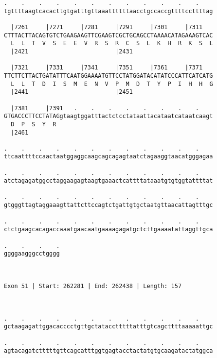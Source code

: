 \documentclass{article}
\begin{document}
\begin{Verbatim}
.    .    .    .    .    .    .    .    .    .    .    .    
tgttttaagtcacacttgtgatttgttaaattttttaacctgccaccgttttccttttag
                                                            
  |7261     |7271     |7281     |7291     |7301     |7311   
CTTTACTTACAGTGTCTGAAGAAGTTCGAAGTCGCTGCAGCCTAAAACATAGAAAGTCAC
  L  L  T  V  S  E  E  V  R  S  R  C  S  L  K  H  R  K  S  L
  |2421                         |2431                       
  
  |7321     |7331     |7341     |7351     |7361     |7371   
TTCTTCTTACTGATATTTCAATGGAAAATGTTCCTATGGATACATATCCCATTCATCATG
  L  L  T  D  I  S  M  E  N  V  P  M  D  T  Y  P  I  H  H  G
  |2441                         |2451                       
  
  |7381     |7391   .    .    .    .    .    .    .    .    
GTGACCCTTCCTATAGgtaagtggatttactctcctataattacataatcataatcaagt
  D  P  S  Y  R                                             
  |2461                                                     
  
.    .    .    .    .    .    .    .    .    .    .    .    
ttcaattttccaactaatggaggcaagcagcagagtaatctagaaggtaacatgggagaa
                                                            
.    .    .    .    .    .    .    .    .    .    .    .    
atctagagatggcctaggaagagtaagtgaaactcattttataaatgtgtggtattttat
                                                            
.    .    .    .    .    .    .    .    .    .    .    .    
gtgggttagtaggaaagttattcttccagtctgattgtgctaatgttaacattagtttgc
                                                            
.    .    .    .    .    .    .    .    .    .    .    .    
ctctgaagcacagaccaaatgaacaatgaaaagagatgctcttgaaaatattaggttgca
                                                            
.    .    .    .
ggggaagggcctgggg
                
                
 
Exon 51 | Start: 262281 | End: 262438 | Length: 157



.    .    .    .    .    .    .    .    .    .    .    .    
gctaagagattggacacccctgttgctatacctttttatttgtcagcttttaaaaattgc
                                                            
.    .    .    .    .    .    .    .    .    .    .    .    
agtacagatctttttgttcagcatttggtgagtacctactatgtgcaagatactatggca
                                                            

\end{Verbatim}
\end{document}
